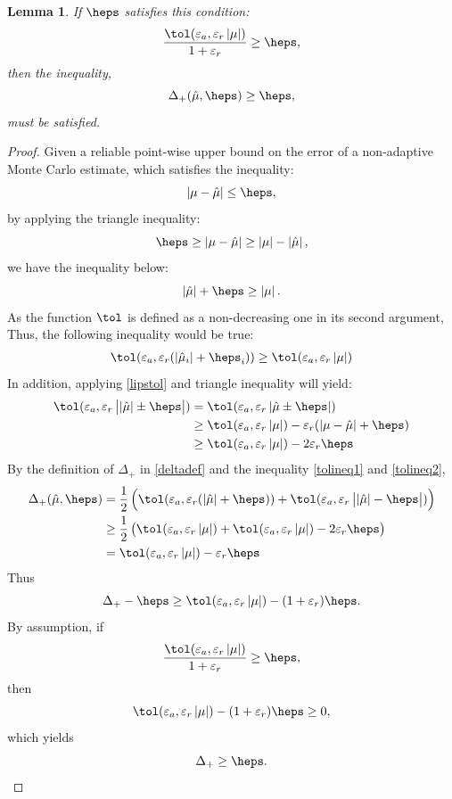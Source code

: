 \documentclass{iitthesis}
\newtheorem{lemma}[theorem]{Lemma}
\begin{document}
\begin{lemma}\label{cost2}
If $\heps$ satisfies this condition: $$\frac{\tol(\varepsilon_a, \varepsilon_r\abs{\mu})}{1+\varepsilon_r} \geq \heps, $$
then the inequality, $$\Delta_{+}(\hmu,\heps)\geq \heps, $$ must be satisfied.
\end{lemma}
\begin{proof}
Given a reliable point-wise upper bound on the error of a non-adaptive Monte Carlo estimate, which satisfies the inequality: $$\abs{\mu -\hmu}\leq \heps,$$by applying the triangle inequality:
$$\heps \geq \abs{\mu -\hmu}\geq \abs{\mu}-\abs{\hmu},$$ 
we have the inequality below: $$\abs{\hmu}+\heps \geq \abs{\mu}.$$
As the function $\tol$ is defined as a non-decreasing one in its second argument, Thus, the following inequality would be true:
\begin{align}\label{tolineq1}
\tol(\varepsilon_a, \varepsilon_r (\abs{\hmu_i}+\heps_i))  \geq \tol(\varepsilon_a, \varepsilon_r \abs{\mu})
\end{align}
In addition, applying \eqref{lipstol} and triangle inequality will yield:
\begin{align}
\tol(\varepsilon_a, \varepsilon_r \abs{\abs{\hmu}\pm \heps})  &= \tol(\varepsilon_a, \varepsilon_r \abs{\hmu \pm\heps}) \\& 
 \geq \tol(\varepsilon_a, \varepsilon_r \abs{\mu}) - \varepsilon_r(\abs{\mu-\hmu}+\heps) \\&
 \geq  \tol(\varepsilon_a, \varepsilon_r \abs{\mu}) - 2\varepsilon_r\heps \label{tolineq2}
\end{align}
By the definition of $\Delta_{+}$ in \eqref{deltadef} and the inequality \eqref{tolineq1} and \eqref{tolineq2},
 \begin{align}
\Delta_{+}(\hmu, \heps) &= \frac{1}{2} \left ( \tol(\varepsilon_a, \varepsilon_r (\abs{\hmu}+\heps)) +\tol(\varepsilon_a, \varepsilon_r \abs{\abs{\hmu}-\heps}) \right) \\&
\geq \frac{1}{2} \left( \tol(\varepsilon_a,\varepsilon_r \abs{\mu}) + \tol(\varepsilon_a, \varepsilon_r \abs{\mu}) - 2\varepsilon_r\heps \right)\\& =  \tol(\varepsilon_a, \varepsilon_r \abs{\mu}) - \varepsilon_r\heps
\end{align}
Thus $$\Delta_{+} -\heps \geq \tol(\varepsilon_a,\varepsilon_r \abs{\mu})-(1+\varepsilon_r)\heps.$$
By assumption, if $$\frac{ \tol(\varepsilon_a,\varepsilon_r \abs{\mu})}{1+\varepsilon_r} \geq \heps,$$ then
$$\tol(\varepsilon_a,\varepsilon_r \abs{\mu})-(1+\varepsilon_r)\heps \geq 0, $$ 
which yields
$$\Delta_{+} \geq \heps.$$
\end{proof}
\end{document}
